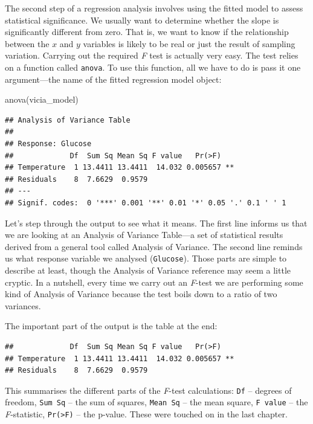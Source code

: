 \documentclass[
]{book}
\newenvironment{Shaded}{\begin{snugshade}}{\end{snugshade}}
\newcommand{\FunctionTok}[1]{\textcolor[rgb]{0.00,0.00,0.00}{#1}}
\newcommand{\NormalTok}[1]{#1}
\begin{document}
The second step of a regression analysis involves using the fitted model to assess statistical significance. We usually want to determine whether the slope is significantly different from zero. That is, we want to know if the relationship between the \(x\) and \(y\) variables is likely to be real or just the result of sampling variation. Carrying out the required \emph{F} test is actually very easy. The test relies on a function called \texttt{anova}. To use this function, all we have to do is pass it one argument---the name of the fitted regression model object:

\begin{Shaded}
\begin{Highlighting}[]
\FunctionTok{anova}\NormalTok{(vicia\_model)}
\end{Highlighting}
\end{Shaded}

\begin{verbatim}
## Analysis of Variance Table
## 
## Response: Glucose
##             Df  Sum Sq Mean Sq F value   Pr(>F)   
## Temperature  1 13.4411 13.4411  14.032 0.005657 **
## Residuals    8  7.6629  0.9579                    
## ---
## Signif. codes:  0 '***' 0.001 '**' 0.01 '*' 0.05 '.' 0.1 ' ' 1
\end{verbatim}

Let's step through the output to see what it means. The first line informs us that we are looking at an Analysis of Variance Table---a set of statistical results derived from a general tool called Analysis of Variance. The second line reminds us what response variable we analysed (\texttt{Glucose}). Those parts are simple to describe at least, though the Analysis of Variance reference may seem a little cryptic. In a nutshell, every time we carry out an \emph{F}-test we are performing some kind of Analysis of Variance because the test boils down to a ratio of two variances.

The important part of the output is the table at the end:

\begin{verbatim}
##             Df  Sum Sq Mean Sq F value   Pr(>F)    
## Temperature  1 13.4411 13.4411  14.032 0.005657 ** 
## Residuals    8  7.6629  0.9579
\end{verbatim}

This summarises the different parts of the \emph{F}-test calculations: \texttt{Df} -- degrees of freedom, \texttt{Sum\ Sq} -- the sum of squares, \texttt{Mean\ Sq} -- the mean square, \texttt{F\ value} -- the \emph{F}-statistic, \texttt{Pr(\textgreater{}F)} -- the p-value. These were touched on in the last chapter.
\end{document}
